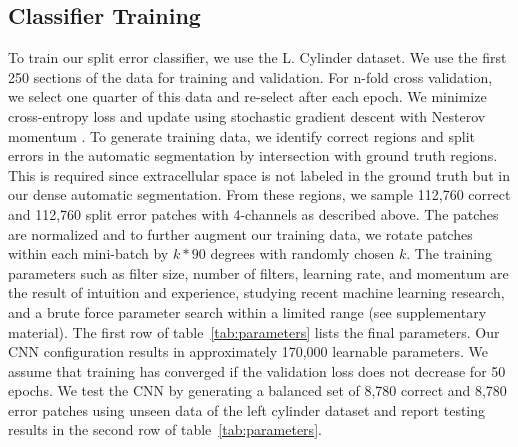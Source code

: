 \subsection{Classifier Training}

To train our split error classifier, we use the L. Cylinder dataset. We use the first 250 sections of the data for training and validation. For n-fold cross validation, we select one quarter of this data and re-select after each epoch. We minimize cross-entropy loss and update using stochastic gradient descent with Nesterov momentum \cite{nesterov}.
To generate training data, we identify correct regions and split errors in the automatic segmentation by intersection with ground truth regions. This is required since extracellular space is not labeled in the ground truth but in our dense automatic segmentation. 
From these regions, we sample 112,760 correct and 112,760 split error patches with 4-channels as described above. The patches are normalized and to further augment our training data, we rotate patches within each mini-batch by $k*90$ degrees with randomly chosen $k$. The training parameters such as filter size, number of filters, learning rate, and momentum are the result of intuition and experience, studying recent machine learning research, and a brute force parameter search within a limited range (see supplementary material). 
The first row of table~\ref{tab:parameters} lists the final parameters. Our CNN configuration results in approximately 170,000 learnable parameters. We assume that training has converged if the validation loss does not decrease for 50 epochs. We test the CNN by generating a balanced set of 8,780 correct and 8,780 error patches using unseen data of the left cylinder dataset and report testing results in the second row of table~\ref{tab:parameters}.

